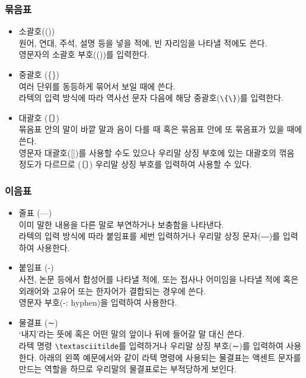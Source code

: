 \subsubsection{묶음표}

\begin{itemize}
\item 소괄호(())\\
  원어, 연대, 주석, 설명 등을 넣을 적에, 빈 자리임을 나타낼 적에도
  쓴다.\\
  영문자의 소괄호 부호(())를 입력한다.

\item 중괄호 (\{\})\\
  여러 단위를 동등하게 묶어서 보일 때에 쓴다.\\
  라텍의 입력 방식에 따라 역사선 문자 다음에 해당
  중괄호(\texttt{\textbackslash\{\textbackslash\}})를 입력한다.

\item 대괄호 (〔〕)\\
  묶음표 안의 말이 바깥 말과 음이 다를 때 혹은 묶음표 안에 또
  묶음표가 있을 때에 쓴다.\\
  영문자 대괄호([])를 사용할 수도 있으나 우리말 상징 부호에 있는
  대괄호의 꺾음 정도가 다르므로 (〔〕) 우리말 상징 부호를 입력하여
  사용할 수 있다.

\end{itemize}

\subsubsection{이음표}

\begin{itemize}
\item 줄표 (---)\\
  이미 말한 내용을 다른 말로 부연하거나 보충함을 나타낸다.\\
  라텍의 입력 방식에 따라 붙임표를 세번 입력하거나 우리말 상징
  문자(―)를 입력하여 사용한다.

\item 붙임표 (-)\\
  사전, 논문 등에서 합성어를 나타낼 적에, 또는 접사나 어미임을 나타낼
  적에 혹은 외래어와 고유어 또는 한자어가 결합되는 경우에 쓴다.\\
  영문자 부호(-: hyphen)을 입력하여 사용한다.

\item 물결표 (∼)\\
  `내지'라는 뜻에 혹은 어떤 말의 앞이나 뒤에 들어갈 말 대신 쓴다.\\
  라텍 명령 \texttt{\textbackslash textasciitilde}를 입력하거나 우리말
  상징 부호(∼)를 입력하여 사용한다.  아래의 왼쪽 예문에서와 같이 라텍
  명령에 사용되는 물결표는 액센트 문자를 만드는 역할을 하므로 우리말의
  물결표로는 부적당하게 보인다.

\end{itemize}


